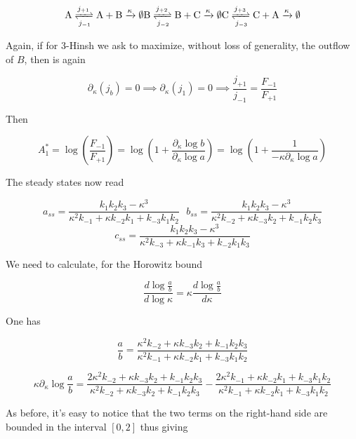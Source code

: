 \documentclass{article}
\begin{document}
	\begin{center}
		\begin{equation}
			\mathrm{A} \xrightleftharpoons[j_{-1}]{j_{+1}}\mathrm{A+B}\xrightarrow{\kappa}\emptyset\\
			\mathrm{B} \xrightleftharpoons[j_{-2}]{j_{+2}}\mathrm{B+C}\xrightarrow{\kappa}\emptyset\\
			\mathrm{C} \xrightleftharpoons[j_{-3}]{j_{+3}}\mathrm{C+A}\xrightarrow{\kappa}\emptyset\\
		\end{equation}
	\end{center}
	
	Again, if for 3-Hinsh we ask to maximize, without loss of generality, the outflow of $B$, then is again
	
	$$\partial_{\kappa}(j_b)=0 \implies \partial_{\kappa}(j_1)=0 \implies \frac{j_{+1}}{j_{-1}}=\frac{F_{-1}}{F_{+1}}$$
	
	Then
	
	$$A_1^*=\log\left(\frac{F_{-1}}{F_{+1}}\right)=\log\left(1+\frac{\partial_{\kappa}\log b}{\partial_{\kappa}\log a}\right)=\log\left(1+\frac{1}{-\kappa \partial_{\kappa}\log a}\right)$$
	
	The steady states now read
	
	$$a_{ss}=\frac{k_1 k_2 k_3-\kappa ^3}{\kappa ^2 k_{-1}+\kappa  k_{-2} k_1+k_{-3} k_1 k_2} \ \ \ b_{ss}=\frac{k_1 k_2 k_3-\kappa ^3}{\kappa ^2 k_{-2}+\kappa  k_{-3} k_2+k_{-1} k_2 k_3}$$ $$c_{ss}=\frac{k_1 k_2 k_3-\kappa ^3}{\kappa ^2 k_{-3}+\kappa  k_{-1} k_3+k_{-2} k_1 k_3}$$
	
	We need to calculate, for the Horowitz bound
	
	\begin{equation}
		\frac{d \log \frac{ a}{b} }{d \log \kappa}=\kappa \frac{d \log \frac{ a }{b} }{d\kappa}
	\end{equation}
	
	One has 
	
	$$\frac{a}{b}=\frac{\kappa ^2 k_{-2}+\kappa  k_{-3} k_2+k_{-1} k_2 k_3}{\kappa ^2 k_{-1}+\kappa  k_{-2} k_1+k_{-3} k_1 k_2}$$
	
	$$\kappa \partial_{\kappa}\log \frac{a}{b}= \frac{2 \kappa ^2 k_{-2}+\kappa  k_{-3} k_2+k_{-1} k_2 k_3}{\kappa ^2 k_{-2}+\kappa  k_{-3} k_2+k_{-1} k_2 k_3} -  \frac{2 \kappa ^2 k_{-1}+\kappa  k_{-2} k_1+k_{-3} k_1 k_2}{\kappa ^2 k_{-1}+\kappa  k_{-2} k_1+k_{-3} k_1 k_2} $$
	
	As before, it's easy to notice that the two terms on the right-hand side are bounded in the interval $[0,2]$ thus giving
	
\end{document}
